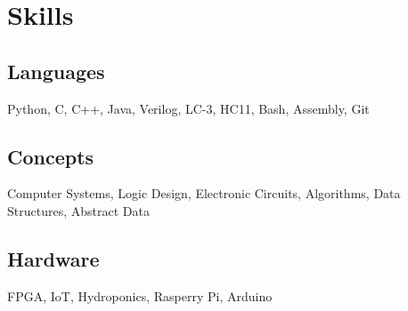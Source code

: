 \documentclass[12pt,letterpaper]{report}
\newcommand{\verticalgap}{2em}
\newcommand{\skillspace}{1em}
\newcommand{\rightcolumn}{0.2\linewidth}
\begin{document}
	\begin{minipage}[t]{\rightcolumn}
		\vspace{\verticalgap}
    \section*{Skills}
    \raggedright
    \subsection*{Languages}
        Python, C, C++, Java, Verilog, LC-3, HC11, Bash, Assembly, Git 
	\vspace{\skillspace}
	\subsection*{Concepts}
    Computer Systems, Logic Design, Electronic Circuits, Algorithms, \newline Data Structures, Abstract Data
      \vspace{\skillspace}
    \subsection*{Hardware}
         FPGA, IoT, Hydroponics, Rasperry Pi, Arduino
	\end{minipage}
%	
\end{document}
